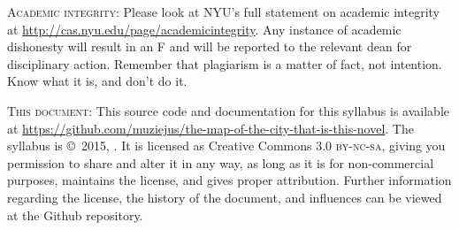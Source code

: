 \begin{description}
  \item \textsc{Academic integrity:} Please look at NYU’s full statement on
    academic integrity at \url{http://cas.nyu.edu/page/academicintegrity}.
    Any instance of academic dishonesty will result in an F and will be
    reported to the relevant dean for disciplinary action. Remember that
    plagiarism is a matter of fact, not intention. Know what it is, and don’t
    do it.

  \item \textsc{This document:} This source code and documentation for this
    syllabus is available at
    \url{https://github.com/muziejus/the-map-of-the-city-that-is-this-novel}.
    The syllabus is \copyright\ 2015, \myauthor. It is licensed as Creative
    Commons 3.0 \textsc{by-nc-sa}, giving you permission to share and alter it
    in any way, as long as it is for non-commercial purposes, maintains the
    license, and gives proper attribution. Further information regarding the
    license, the history of the document, and influences can be viewed
    at the Github repository.

\end{description}
